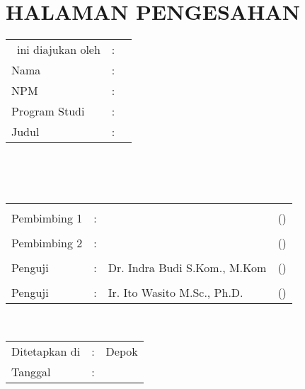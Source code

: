 %
%
%

\chapter*{HALAMAN PENGESAHAN}

\vspace*{0.4cm}
\noindent 

\noindent
\begin{tabular}{ll p{9cm}}
	\type~ini diajukan oleh&: & \\
	Nama&: & \penulis \\
	NPM&: & \npm \\
	Program Studi&: & \program \\
	Judul \type&: & \judul \\
\end{tabular} \\

\vspace*{1.0cm}

\noindent {}\\[0.2cm]

\begin{center}
\end{center}

\vspace*{0.3cm}

\begin{tabular}{l l l l }
	& & & \\
	Pembimbing 1&: & \pembimbing & (\hspace*{3.0cm}) \\
	& & & \\
	Pembimbing 2&: & \pembimbingdua & (\hspace*{3.0cm}) \\
	& & & \\
	Penguji&: & Dr. Indra Budi S.Kom., M.Kom & (\hspace*{3.0cm}) \\
	& & & \\
	Penguji&: & Ir. Ito Wasito M.Sc., Ph.D. & (\hspace*{3.0cm}) \\
\end{tabular}\\

\vspace*{2.0cm}

\begin{tabular}{ll l}
	Ditetapkan di&: & Depok\\
	Tanggal&: & \tanggalLulus \\
\end{tabular}


\newpage